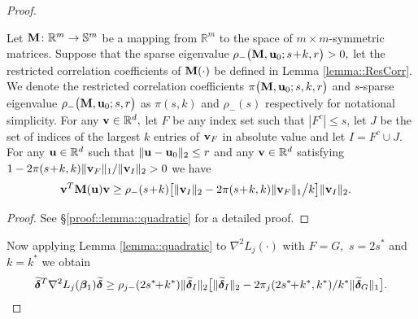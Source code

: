\documentclass[twoside,11pt]{article}
\newcommand*{\BR}{\mathbb{R}}
\newcommand*{\tbdelta}{\tilde \bdelta}
\begin{document}
\begin{proof}
\begin{lemma}\label{lemma::quadratic}
Let $\Mb \colon \BR^{m} \rightarrow \mathbb{S}^{m}$ be a mapping from $\BR^{m}$ to the space of $m\times m$-symmetric matrices. Suppose that the sparse eigenvalue $\rho_{-}\bigl ( \mathbf{M}, \mathbf{u}_0; s\!+\!k,r\bigr) >0,$ let the restricted correlation coefficients of $\mathbf{M}(\cdot)$ be defined in Lemma \ref{lemma::ResCorr}. We denote the restricted correlation coefficients $ \pi \bigl(\mathbf{M}, \mathbf{u}_0;s,k,r\bigr)$ and $s$-sparse eigenvalue $\rho_{-}\bigl(\mathbf{M} , \mathbf{u}_0;s,r\bigr)$ as $\pi(s,k)$ and $\rho_{-}(s)$ respectively for notational simplicity.  For any $\vb\in \BR^{d},$ let $F$ be any index set such that  $|F^c | \leq s$, let $J$ be the set of indices of the largest $k$ entries of $\mathbf{v}_F$ in absolute value and let $I = F^c \cup J$. For any $\ub\in \BR^{d}$ such that $  \| \mathbf{u} - \mathbf{u}_0 \|_2 \leq r$ and any $\vb\in \BR^{d}$ satisfying  $1 -2 \pi(s\!+\!k,k)   \| \mathbf{v}_F  \|_1/  \| \mathbf{v}_I  \|_2  > 0$ we have
\begin{align*}
\mathbf{v} ^T \mathbf{M}(\mathbf{u}) \mathbf{v} &\geq \rho_{-}(s\!+\!k) \bigl[  \|\mathbf{v}_I \|_2- 2 \pi(s\!+\!k,k) \|\mathbf{v}_F \|_1\big/k\bigr ]  \|\mathbf{v}_I \|_2.
\end{align*}
\end{lemma}
\begin{proof} 
See \S \ref{proof::lemma::quadratic} for a detailed proof.
\end{proof}

 Now applying Lemma \ref{lemma::quadratic}  to $\nabla^2 L_j(\cdot) $ with $F \!=\! G,$ $s\!=\!2s^*$ and $k\!= \! k^*$  we obtain 
\begin{align}\label{equ::UseQuadratic}
\tbdelta^T \nabla^2 L_j(\bbeta_1)\tbdelta\geq  \rho_{j-}(2s^*\!\! + \! k^*) \| \tbdelta _I \|_2 \bigl[   \| \tbdelta _I \|_2 -2  \pi_j(2s^* \!\!+\! k^*, k^*) / k^*  \| \tbdelta _G \|_1\bigr].
\end{align}


\end{proof}
\end{document}
